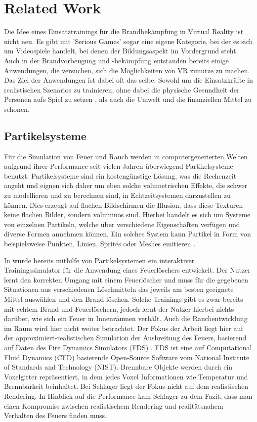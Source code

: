 \section{Related Work}
\label{sec:2}

Die Idee eines Einsatztrainings für die Brandbekämpfung in Virtual Reality ist nicht neu. Es gibt mit
'Serious Games' sogar eine eigene Kategorie, bei der es sich um Videospiele handelt, bei denen der
Bildungsaspekt im Vordergrund steht. Auch in der Brandvorbeugung und -bekämpfung entstanden bereits einige Anwendungen,
die versuchen, sich die Möglichkeiten von VR zunutze zu machen.
Das Ziel der Anwendungen ist dabei oft das selbe. Sowohl um die Einsatzkräfte in realistischen Szenarios zu trainieren,
ohne dabei die physische Gesundheit der Personen aufs Spiel zu setzen \parencite{WilliamsBell2014} , als auch die Umwelt und die finanziellen Mittel zu schonen.


\subsection{Partikelsysteme}
Für die Simulation von Feuer und Rauch werden in computergenerierten Welten aufgrund ihrer  Performance seit vielen Jahren 
überwiegend Partikelsysteme benutzt. 
Partikelsysteme sind ein kostengünstige Lösung, was die Rechenzeit angeht und eignen sich daher um eben solche
volumetrischen Effekte, die schwer zu modellieren und zu berechnen sind, in Echtzeitsystemen darzustellen zu können. 
Dies erzeugt auf flachen Bildschirmen die Illusion, dass diese Texturen keine flachen Bilder, 
sondern voluminös sind. Hierbei handelt es sich um Systeme von einzelnen Partikeln, welche über verschiedene 
Eigenschaften verfügen und diverse Formen annehmen können. Ein solches System kann Partikel in Form von beispielsweise Punkten, 
Linien, Sprites oder Meshes emitieren \parencite{Reeves1983}.

In \textcite{Schlager2017} wurde bereits mithilfe von Partikelsystemen ein interaktiver Trainingssimulator für die Anwendung 
eines Feuerlöschers entwickelt. Der Nutzer lernt den korrekten Umgang mit einem Feuerlöscher und muss für die gegebenen Situationen 
aus verschiedenen Löschmitteln das jeweils am besten geeignete Mittel auswählen und den Brand löschen. Solche Trainings 
gibt es zwar bereits mit echtem Brand und Feuerlöschern, jedoch lernt der Nutzer hierbei nichts darüber, wie sich ein Feuer in 
Innenräumen verhält. Auch die Rauchentwicklung im Raum wird hier nicht weiter betrachtet. Der Fokus der Arbeit liegt hier auf der 
approximiert-realistischen Simulation der Ausbreitung des Feuers, basierend auf Daten des Fire Dynamics Simulators (FDS) \parencite{FDS2004}. 
FDS ist eine auf Computational Fluid Dynamics (CFD) basierende Open-Source Software vom National Institute of Standards and Technology (NIST).
Brennbare Objekte werden durch ein Voxelgitter repräsentiert, in dem jedes Voxel Informationen wie Temperatur und Brennbarkeit beinhaltet.
Bei Schlager liegt der Fokus nicht auf dem realistischen Rendering. 
In Hinblick auf die Performance kam Schlager zu dem Fazit, dass man einen Kompromiss zwischen realistischem Rendering 
und realitätsnahem Verhalten des Feuers finden muss.


